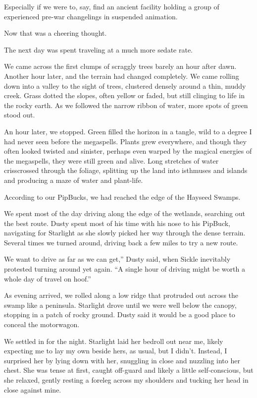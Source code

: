 Especially if we were to, say, find an ancient facility holding a group of experienced pre-war changelings in suspended animation.

Now that was a cheering thought.

{\br}%
The next day was spent traveling at a much more sedate rate.

We came across the first clumps of scraggly trees barely an hour after dawn. Another hour later, and the terrain had changed completely. We came rolling down into a valley to the sight of trees, clustered densely around a thin, muddy creek. Grass dotted the slopes, often yellow or faded, but still clinging to life in the rocky earth. As we followed the narrow ribbon of water, more spots of green stood out.

An hour later, we stopped. Green filled the horizon in a tangle, wild to a degree I had never seen before the megaspells. Plants grew everywhere, and though they often looked twisted and sinister, perhaps even warped by the magical energies of the megaspells, they were still green and alive. Long stretches of water crisscrossed through the foliage, splitting up the land into isthmuses and islands and producing a maze of water and plant-life.

According to our PipBucks, we had reached the edge of the Hayseed Swamps.

We spent most of the day driving along the edge of the wetlands, searching out the best route. Dusty spent most of his time with his nose to his PipBuck, navigating for Starlight as she slowly picked her way through the dense terrain. Several times we turned around, driving back a few miles to try a new route.

\leavevmode{}We want to drive as far as we can get,” Dusty said, when Sickle inevitably protested turning around yet again. “A single hour of driving might be worth a whole day of travel on hoof.”

As evening arrived, we rolled along a low ridge that protruded out across the swamp like a peninsula. Starlight drove until we were well below the canopy, stopping in a patch of rocky ground. Dusty said it would be a good place to conceal the motorwagon.

We settled in for the night. Starlight laid her bedroll out near me, likely expecting me to lay my own beside hers, as usual, but I didn’t. Instead, I surprised her by lying down with her, snuggling in close and nuzzling into her chest. She was tense at first, caught off-guard and likely a little self-conscious, but she relaxed, gently resting a foreleg across my shoulders and tucking her head in close against mine.

